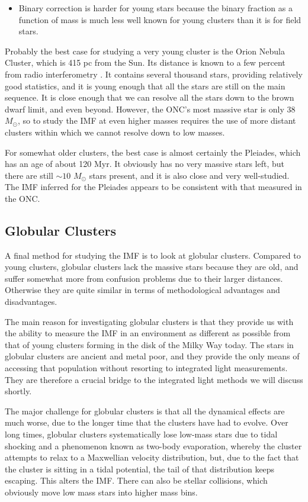 \begin{itemize}
\item Binary correction is harder for young stars because the binary fraction as a function of mass is much less well known for young clusters than it is for field stars.
\end{itemize}

Probably the best case for studying a very young cluster is the Orion Nebula Cluster, which is 415 pc from the Sun. Its distance is known to a few percent from radio interferometry \citep{sandstrom07a, menten07a, kim08a}. It contains several thousand stars, providing relatively good statistics, and it is young enough that all the stars are still on the main sequence. It is close enough that we can resolve all the stars down to the brown dwarf limit, and even beyond. However, the ONC's most massive star is only 38 $M_\odot$, so to study the IMF at even higher masses requires the use of more distant clusters within which we cannot resolve down to low masses. 

For somewhat older clusters, the best case is almost certainly the Pleiades, which has an age of about 120 Myr. It obviously has no very massive stars left, but there are still $\sim 10$ $M_\odot$ stars present, and it is also close and very well-studied. The IMF inferred for the Pleiades appears to be consistent with that measured in the ONC.

\subsection{Globular Clusters}

A final method for studying the IMF is to look at globular clusters. Compared to young clusters, globular clusters lack the massive stars because they are old, and suffer somewhat more from confusion problems due to their larger distances. Otherwise they are quite similar in terms of methodological advantages and disadvantages.

The main reason for investigating globular clusters is that they provide us with the ability to measure the IMF in an environment as different as possible from that of young clusters forming in the disk of the Milky Way today. The stars in globular clusters are ancient and metal poor, and they provide the only means of accessing that population without resorting to integrated light measurements. They are therefore a crucial bridge to the integrated light methods we will discuss shortly.

The major challenge for globular clusters is that all the dynamical effects are much worse, due to the longer time that the clusters have had to evolve. Over long times, globular clusters systematically lose low-mass stars due to tidal shocking and a phenomenon known as two-body evaporation, whereby the cluster attempts to relax to a Maxwellian velocity distribution, but, due to the fact that the cluster is sitting in a tidal potential, the tail of that distribution keeps escaping. This alters the IMF. There can also be stellar collisions, which obviously move low mass stars into higher mass bins.

